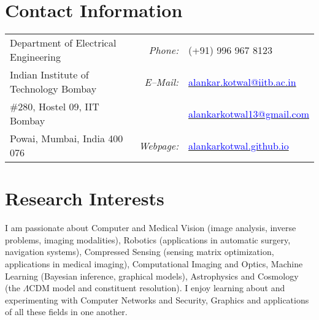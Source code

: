 \documentclass[margin,line]{res}
\begin{document}

\begin{resume}
\section{\sc Contact Information}
\vspace{.05in}
\begin{tabular}{@{}p{2.9in}p{.5in}p{3in}}
Department of Electrical Engineering & \multicolumn{1}{r}{\it Phone:}  &(+91) 996 967 8123 \\            
Indian Institute of Technology Bombay &\multicolumn{1}{r}{\it E--Mail:}& \href{mailto:alankar.kotwal@iitb.ac.in}{\textcolor{blue}{alankar.kotwal@iitb.ac.in}} \\ 
\#280, Hostel 09, IIT Bombay & & \href{mailto:alankarkotwal13@gmail.com}{\textcolor{blue}{alankarkotwal13@gmail.com}} \\ 
Powai, Mumbai, India 400 076 & \multicolumn{1}{r}{\it Webpage:} &\href{http://alankarkotwal.github.io/}{\textcolor{blue}{alankarkotwal.github.io}} \\     
\end{tabular}

\section{\sc Research Interests}
\lettrine[lines=2]{I}{} am passionate about Computer and Medical Vision (image analysis, inverse problems, imaging modalities), Robotics (applications in automatic surgery, navigation systems), Compressed Sensing (sensing matrix optimization, applications in medical imaging), Computational Imaging and Optics, Machine Learning (Bayesian inference, graphical models), Astrophysics and Cosmology (the $\Lambda$CDM model and constituent resolution). I enjoy learning about and experimenting with Computer Networks and Security, Graphics and applications of all these fields in one another.


\end{resume}
\end{document}
